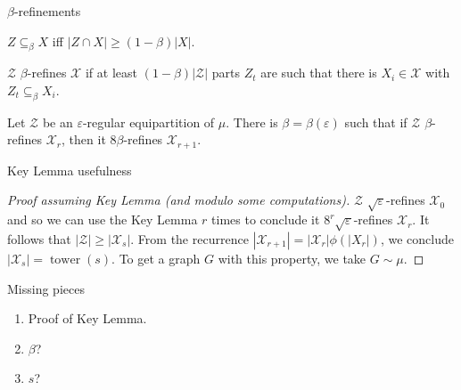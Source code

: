 \documentclass{beamer}
\DeclareMathOperator{\twr}{\mathrm{tower}}
\newcommand{\1}{\mathbbm{1}}
\newcommand{\X}{\mathcal{X}}
\newcommand{\Z}{\mathcal{Z}}
\newcommand{\eps}{\varepsilon}
\begin{document}
\begin{frame}{$\beta$-refinements}
  \begin{definition}
    $Z \subseteq_\beta X$ iff $|Z \cap X| \ge (1 - \beta)|X|$.
  \end{definition}

  \pause

  \begin{definition}[$\Z$ $\beta$-refining $\X$]
    $\Z$ $\beta$-refines $\X$ if at least $(1 - \beta)|\Z|$ parts $Z_t$ are such that
    there is $X_i \in \X$ with $Z_t \subseteq_\beta X_i$.
  \end{definition}

  \pause

  \begin{lemma}
    Let $\Z$ be an $\eps$-regular equipartition of $\mu$. There is $\beta = \beta(\eps)$
    such that if $\Z$ $\beta$-refines $\X_r$, then it $8\beta$-refines $\X_{r + 1}$.
  \end{lemma}
\end{frame}

\begin{frame}{Key Lemma usefulness}
  \begin{proof}[Proof assuming Key Lemma (and modulo some computations)]
    \pause
    $\Z$ $\sqrt{\eps}$-refines $\X_0$ and so we can use the Key Lemma $r$ times to
    conclude it $8^r \sqrt{\eps}$-refines $\X_r$.
    \pause
    It follows that $|\Z| \ge |\X_s|$.
    \pause
    From the recurrence $|\X_{r + 1}| = |\X_r| \phi(|X_r|)$, we conclude $|\X_s| =
      \twr(s)$.
    \pause
    To get a graph $G$ with this property, we take $G \sim \mu$.
  \end{proof}

  \pause

  \begin{block}{Missing pieces}
    \begin{enumerate}
      \item Proof of Key Lemma.
            \pause
      \item $\beta$?
            \pause
      \item $s$?
    \end{enumerate}
  \end{block}
\end{frame}
\end{document}
